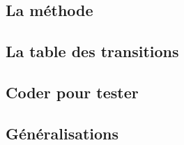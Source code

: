 \subsection{La méthode}

	


\subsection{La table des transitions}

	


\subsection{Coder pour tester}

	


\subsection{Généralisations}

	
